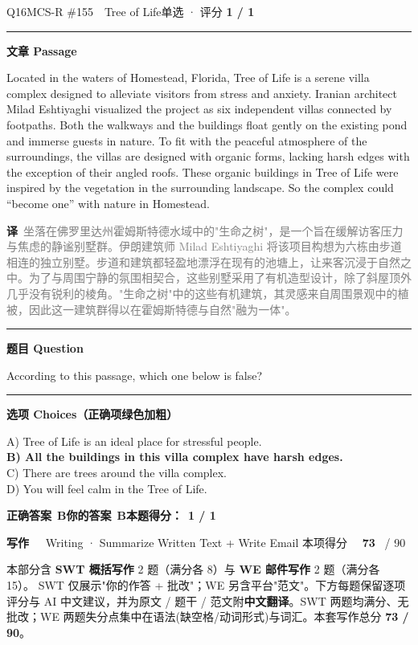 \documentclass[11pt]{article}
\newcommand{\ptesub}[1]{%
  \par\needspace{2\baselineskip}\smallskip
  {\color{cAccent}\rule[-0.2ex]{3pt}{1.05em}}\hspace{6pt}%
  {\bfseries\color{cHead}#1}\par\nopagebreak\smallskip}
\newcommand{\ptesection}[3]{%
  \addcontentsline{toc}{section}{#1}%
  \needspace{6\baselineskip}
  \begin{tcolorbox}[enhanced, colback=cAccent, colframe=cAccent, sharp corners,
     left=14pt, right=14pt, top=10pt, bottom=10pt, boxrule=0pt]
    {\fontsize{20}{24}\selectfont\bfseries\color{white} #1\ \ }%
    {\large\color{white!85} #2}\hfill
    {\large\color{white}本项得分\ \ }{\fontsize{22}{24}\selectfont\bfseries\color{white} #3}%
    \ {\color{white!85}/ 90}
  \end{tcolorbox}}
\newcommand{\zh}[1]{{\footnotesize\textcolor{cNote}{\textbf{译}}\ \textcolor{gray}{#1}}}
\begin{document}
\begin{qblock}{Q16\quad MCS-R \#155\ \ Tree of Life}{单选 · 评分 \textcolor{cAccent}{\bfseries 1 / 1}}
\ptesub{文章 Passage}
\begin{promptbox}
Located in the waters of Homestead, Florida, Tree of Life is a serene villa complex designed to alleviate visitors from stress and anxiety. Iranian architect Milad Eshtiyaghi visualized the project as six independent villas connected by footpaths. Both the walkways and the buildings float gently on the existing pond and immerse guests in nature. To fit with the peaceful atmosphere of the surroundings, the villas are designed with organic forms, lacking harsh edges with the exception of their angled roofs. These organic buildings in Tree of Life were inspired by the vegetation in the surrounding landscape. So the complex could ``become one'' with nature in Homestead.
\end{promptbox}
\zh{坐落在佛罗里达州霍姆斯特德水域中的"生命之树"，是一个旨在缓解访客压力与焦虑的静谧别墅群。伊朗建筑师 Milad Eshtiyaghi 将该项目构想为六栋由步道相连的独立别墅。步道和建筑都轻盈地漂浮在现有的池塘上，让来客沉浸于自然之中。为了与周围宁静的氛围相契合，这些别墅采用了有机造型设计，除了斜屋顶外几乎没有锐利的棱角。"生命之树"中的这些有机建筑，其灵感来自周围景观中的植被，因此这一建筑群得以在霍姆斯特德与自然"融为一体"。}
\ptesub{题目 Question}
\begin{notebox}According to this passage, which one below is false?\end{notebox}
\ptesub{选项 Choices（正确项绿色加粗）}
{\small
A) Tree of Life is an ideal place for stressful people.\\
{\color{cFix}\textbf{B) All the buildings in this villa complex have harsh edges.}}\\
C) There are trees around the villa complex.\\
D) You will feel calm in the Tree of Life.}
\par\smallskip
\textbf{正确答案}\ \textcolor{cFix}{\bfseries B}\qquad\textbf{你的答案}\ \textcolor{cFix}{\bfseries B}\qquad\textbf{本题得分：}\ {\color{cAccent}\bfseries 1 / 1}
\end{qblock}

\clearpage
\ptesection{写作}{Writing · Summarize Written Text + Write Email}{73}

\vspace{1mm}
{\small\color{gray} 本部分含 \textbf{SWT 概括写作} 2 题（满分各 8）与 \textbf{WE 邮件写作} 2 题（满分各 15）。
SWT 仅展示"你的作答 + 批改"；WE 另含平台"范文"。下方每题保留逐项评分与 AI 中文建议，并为原文 / 题干 / 范文附\textbf{中文翻译}。SWT 两题均满分、无批改；WE 两题失分点集中在语法(缺空格/动词形式)与词汇。本套写作总分 \textbf{73 / 90}。}
\vspace{2mm}
\end{document}
